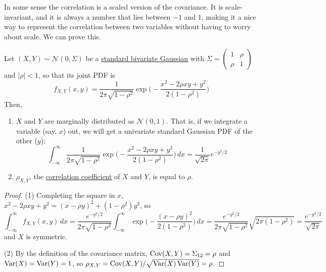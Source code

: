   In some sense the correlation is a scaled version of the covariance. It is scale-invariant, and it is always a number that lies between $-1$ and $1$, making it a nice way to represent the correlation between two variables without having to worry about scale. We can prove this. 

  \begin{theorem}
    \label{thm:marginals-of-a-standard-bivariate-gaussian}
    Let $(X, Y) \sim \mathcal{N}(0, \Sigma)$ be a \hyperref[def:multivariate-gaussian]{standard bivariate Gaussian} with $\Sigma = \begin{pmatrix} 1 & \rho \\ \rho & 1 \end{pmatrix}$ and $|\rho| < 1$, so that its joint PDF is 
    \begin{equation}
      f_{X, Y} (x, y) = \frac{1}{2 \pi \sqrt{1 - \rho^2}} \exp \bigg( -\frac{x^2 - 2 \rho x y + y^2}{2 (1 - \rho^2)}\bigg)
    \end{equation}
    Then, 
    \begin{enumerate}
      \item $X$ and $Y$ are marginally distributed as $\mathcal{N}(0, 1)$. That is, if we integrate a variable (say, $x$) out, we will get a univariate standard Gaussian PDF of the other ($y$): 
      \begin{equation}
        \int_{-\infty}^\infty \frac{1}{2 \pi \sqrt{1 - \rho^2}} \exp \bigg( -\frac{x^2 - 2 \rho x y + y^2}{2 (1 - \rho^2)}\bigg) \,dx = \frac{1}{\sqrt{2 \pi}} e^{-y^2 / 2}
      \end{equation}
      \item $\rho_{X, Y}$, the \hyperref[def:correlation-coefficient]{correlation coefficient} of $X$ and $Y$, is equal to $\rho$. 
    \end{enumerate}
  \end{theorem}
  \begin{proof}
    (1) Completing the square in $x$, $x^2 - 2 \rho x y + y^2 = (x - \rho y)^2 + (1 - \rho^2) y^2$, so 
    \begin{equation}
      \int_{-\infty}^\infty f_{X, Y} (x, y) \,dx = \frac{e^{-y^2/2}}{2 \pi \sqrt{1 - \rho^2}} \int_{-\infty}^\infty \exp \bigg( -\frac{(x - \rho y)^2}{2 (1 - \rho^2)} \bigg) \,dx = \frac{e^{-y^2/2}}{2 \pi \sqrt{1 - \rho^2}} \sqrt{2 \pi (1 - \rho^2)} = \frac{e^{-y^2/2}}{\sqrt{2 \pi}}
    \end{equation}
    and $X$ is symmetric. 

    (2) By the definition of the covariance matrix, $\operatorname{Cov}(X, Y) = \Sigma_{12} = \rho$ and $\operatorname{Var}(X) = \operatorname{Var}(Y) = 1$, so $\rho_{X, Y} = \operatorname{Cov}(X, Y) / \sqrt{\operatorname{Var}(X) \operatorname{Var}(Y)} = \rho$. 
  \end{proof}

